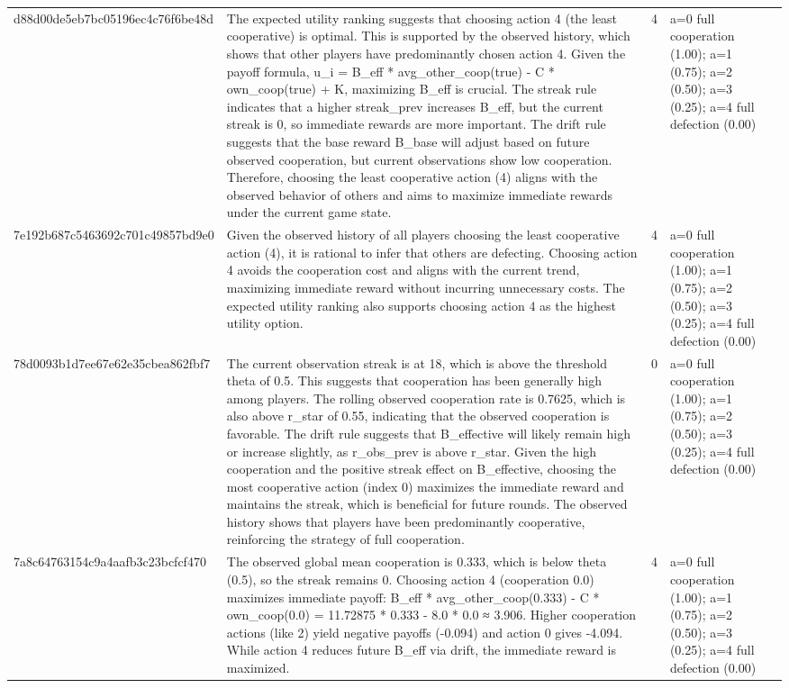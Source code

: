 \begin{tabular}{lp{8cm}ll l}
d88d00de5eb7bc05196ec4c76f6be48d & The expected utility ranking suggests that choosing action 4 (the least cooperative) is optimal. This is supported by the observed history, which shows that other players have predominantly chosen action 4. Given the payoff formula, u\_i = B\_eff * avg\_other\_coop(true) - C * own\_coop(true) + K, maximizing B\_eff is crucial. The streak rule indicates that a higher streak\_prev increases B\_eff, but the current streak is 0, so immediate rewards are more important. The drift rule suggests that the base reward B\_base will adjust based on future observed cooperation, but current observations show low cooperation. Therefore, choosing the least cooperative action (4) aligns with the observed behavior of others and aims to maximize immediate rewards under the current game state. & 4 & a=0 full cooperation (1.00); a=1 (0.75); a=2 (0.50); a=3 (0.25); a=4 full defection (0.00) &  \\
7e192b687c5463692c701c49857bd9e0 & Given the observed history of all players choosing the least cooperative action (4), it is rational to infer that others are defecting. Choosing action 4 avoids the cooperation cost and aligns with the current trend, maximizing immediate reward without incurring unnecessary costs. The expected utility ranking also supports choosing action 4 as the highest utility option. & 4 & a=0 full cooperation (1.00); a=1 (0.75); a=2 (0.50); a=3 (0.25); a=4 full defection (0.00) &  \\
78d0093b1d7ee67e62e35cbea862fbf7 & The current observation streak is at 18, which is above the threshold theta of 0.5. This suggests that cooperation has been generally high among players. The rolling observed cooperation rate is 0.7625, which is also above r\_star of 0.55, indicating that the observed cooperation is favorable. The drift rule suggests that B\_effective will likely remain high or increase slightly, as r\_obs\_prev is above r\_star. Given the high cooperation and the positive streak effect on B\_effective, choosing the most cooperative action (index 0) maximizes the immediate reward and maintains the streak, which is beneficial for future rounds. The observed history shows that players have been predominantly cooperative, reinforcing the strategy of full cooperation. & 0 & a=0 full cooperation (1.00); a=1 (0.75); a=2 (0.50); a=3 (0.25); a=4 full defection (0.00) &  \\
7a8c64763154c9a4aafb3c23bcfcf470 & The observed global mean cooperation is 0.333, which is below theta (0.5), so the streak remains 0. Choosing action 4 (cooperation 0.0) maximizes immediate payoff: B\_eff * avg\_other\_coop(0.333) - C * own\_coop(0.0) = 11.72875 * 0.333 - 8.0 * 0.0 ≈ 3.906. Higher cooperation actions (like 2) yield negative payoffs (-0.094) and action 0 gives -4.094. While action 4 reduces future B\_eff via drift, the immediate reward is maximized. & 4 & a=0 full cooperation (1.00); a=1 (0.75); a=2 (0.50); a=3 (0.25); a=4 full defection (0.00) &  \\

\end{tabular}
